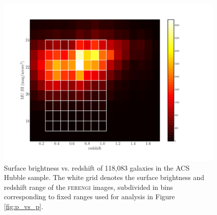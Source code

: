 \documentclass[usenatbib]{mn2e}
\newcommand{\ferengi}{\textsc{ferengi}}
\begin{document}
\begin{figure}
\begin{center}
\includegraphics[width=\textwidth]{figures/eye_of_sauron.pdf}
\caption{Surface brightness vs. redshift of 118,083 galaxies in the ACS Hubble sample. The white grid denotes the surface brightness and redshift range of the \ferengi{} images, subdivided in bins corresponding to fixed ranges used for analysis in Figure \ref{fig:p_vs_p}.}

\label{fig:features_corrections}
\end{center}
\end{figure}
\end{document}
